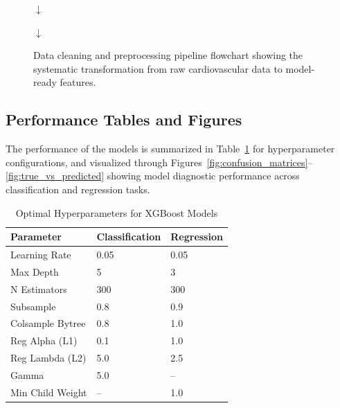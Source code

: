 \documentclass[conference]{IEEEtran}
\begin{document}
\begin{figure}[h]
\begin{minipage}{0.48\textwidth}
        \vspace{0.2cm}
        $\downarrow$
        
        
        \vspace{0.2cm}
        $\downarrow$
        
    \end{minipage}
    \caption{Data cleaning and preprocessing pipeline flowchart showing the systematic transformation from raw cardiovascular data to model-ready features.}
    \label{fig:data_cleaning_process}
\end{figure}

\subsection{Performance Tables and Figures}
\label{sec:performance_metrics}
The performance of the models is summarized in Table~\ref{tab:hyperparameters} for hyperparameter configurations, and visualized through Figures~\ref{fig:confusion_matrices}--\ref{fig:true_vs_predicted} showing model diagnostic performance across classification and regression tasks.
\begin{table}[h]
\centering
\caption{Optimal Hyperparameters for XGBoost Models}
\label{tab:hyperparameters}
\begin{center}
\begin{tabular}{p{3cm}p{2cm}p{2cm}}
\toprule
\textbf{Parameter} & \textbf{Classification} & \textbf{Regression} \\
\midrule
Learning Rate & 0.05 & 0.05 \\
Max Depth & 5 & 3 \\
N Estimators & 300 & 300 \\
Subsample & 0.8 & 0.9 \\
Colsample Bytree & 0.8 & 1.0 \\
Reg Alpha (L1) & 0.1 & 1.0 \\
Reg Lambda (L2) & 5.0 & 2.5 \\
Gamma & 5.0 & -- \\
Min Child Weight & -- & 1.0 \\
\bottomrule
\end{tabular}
\end{center}
\end{table}
\end{document}
